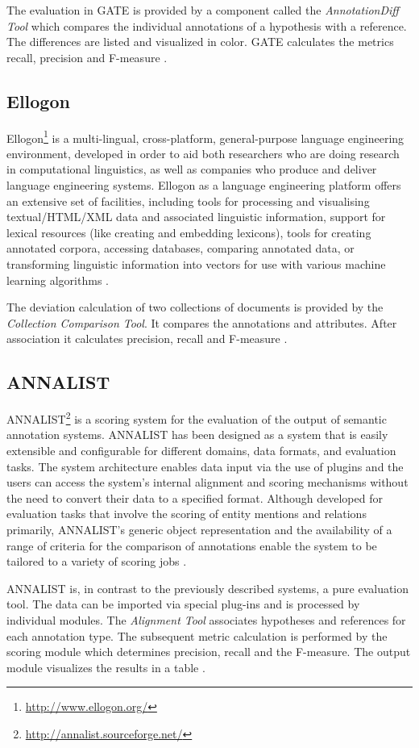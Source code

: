 The evaluation in GATE is provided by a component called the \textit{AnnotationDiff Tool} which compares the individual annotations of a hypothesis with a reference. The differences are listed and visualized in color. GATE calculates the metrics recall, precision and F-measure \cite{Linsmayr:2010}.

\subsection{Ellogon}
Ellogon\footnote{\url{http://www.ellogon.org/}} is a multi-lingual, cross-platform, general-purpose language engineering environment, developed in order to aid both researchers who are doing research in computational linguistics, as well as companies who produce and deliver language engineering systems. Ellogon as a language engineering platform offers an extensive set of facilities, including tools for processing and visualising textual/HTML/XML data and associated linguistic information, support for lexical resources (like creating and embedding lexicons), tools for creating annotated corpora, accessing databases, comparing annotated data, or transforming linguistic information into vectors for use with various machine learning algorithms \cite{Ellogon}.

The deviation calculation of two collections of documents is provided by the \textit{Collection Comparison Tool}. It compares the annotations and attributes. After association it calculates precision, recall and F-measure \cite{Linsmayr:2010}.

\subsection{ANNALIST}
\gls{ANNALIST}\footnote{\url{http://annalist.sourceforge.net/}} is a scoring system for the evaluation of the output of semantic annotation systems. ANNALIST has been designed as a system that is easily extensible and configurable for different domains, data formats, and evaluation tasks. The system architecture enables data input via the use of plugins and the users can access the system’s internal alignment and scoring mechanisms without the need to convert their data to a specified format. Although developed for evaluation tasks that involve the scoring of entity mentions and relations primarily, ANNALIST's generic object representation and the availability of a range of criteria for the comparison of annotations enable the system to be tailored to a variety of scoring jobs \cite{Demetriou:2008}.

ANNALIST is, in contrast to the previously described systems, a pure evaluation tool. The data can be imported via special plug-ins and is processed by individual modules. The \textit{Alignment Tool} associates hypotheses and references for each annotation type. The subsequent metric calculation is performed by the scoring module which determines precision, recall and the F-measure. The output module visualizes the results in a table \cite{Linsmayr:2010}.